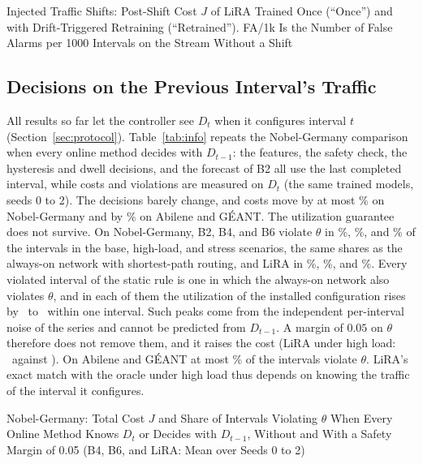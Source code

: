 \documentclass[preprint,12pt]{elsarticle}
\begin{document}
\begin{table}[t]
\centering
\caption{Injected Traffic Shifts: Post-Shift Cost $J$ of LiRA Trained Once (``Once'') and with Drift-Triggered Retraining (``Retrained''). FA/1k Is the Number of False Alarms per 1000 Intervals on the Stream Without a Shift}
\label{tab:drift}
\footnotesize
\setlength{\tabcolsep}{3pt}
\begin{adjustbox}{max width=\textwidth}\end{adjustbox}
\end{table}

\subsection{Decisions on the Previous Interval's Traffic}\label{sec:res-stale}

All results so far let the controller see $D_t$ when it configures interval $t$ (Section~\ref{sec:protocol}). Table~\ref{tab:info} repeats the Nobel-Germany comparison when every online method decides with $D_{t-1}$: the features, the safety check, the hysteresis and dwell decisions, and the forecast of B2 all use the last completed interval, while costs and violations are measured on $D_t$ (the same trained models, seeds 0 to 2). The decisions barely change, and costs move by at most \staleNobMaxDJ\% on Nobel-Germany and by \staleRealDJtext\% on Abilene and G\'{E}ANT. The utilization guarantee does not survive. On Nobel-Germany, B2, B4, and B6 violate $\theta$ in \staleBzerobase\%, \staleBzerohl\%, and \staleBzerost\% of the intervals in the base, high-load, and stress scenarios, the same shares as the always-on network with shortest-path routing, and LiRA in \staleLiRAViolbase\%, \staleLiRAViolhl\%, and \staleLiRAViolst\%. Every violated interval of the static rule is one in which the always-on network also violates $\theta$, and in each of them the utilization of the installed configuration rises by \staleJumpMin\ to \staleJumpMax\ within one interval. Such peaks come from the independent per-interval noise of the series and cannot be predicted from $D_{t-1}$. A margin of $0.05$ on $\theta$ therefore does not remove them, and it raises the cost (LiRA under high load: \marginLiRAhlJ\ against \nobJLiRAhl). On Abilene and G\'{E}ANT at most \staleRealMaxViol\% of the intervals violate $\theta$. LiRA's exact match with the oracle under high load thus depends on knowing the traffic of the interval it configures.

\begin{table}[t]
\centering
\caption{Nobel-Germany: Total Cost $J$ and Share of Intervals Violating $\theta$ When Every Online Method Knows $D_t$ or Decides with $D_{t-1}$, Without and With a Safety Margin of 0.05 (B4, B6, and LiRA: Mean over Seeds 0 to 2)}
\label{tab:info}
\scriptsize
\setlength{\tabcolsep}{3pt}
\begin{adjustbox}{max width=\textwidth}\end{adjustbox}
\end{table}
\end{document}
